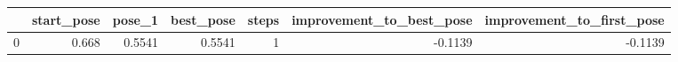 \begin{tabular}{lrrrrrr}
\toprule
{} &  start\_pose &  pose\_1 &  best\_pose &  steps &  improvement\_to\_best\_pose &  improvement\_to\_first\_pose \\
\midrule
0 &       0.668 &  0.5541 &     0.5541 &      1 &                   -0.1139 &                    -0.1139 \\
\bottomrule
\end{tabular}
